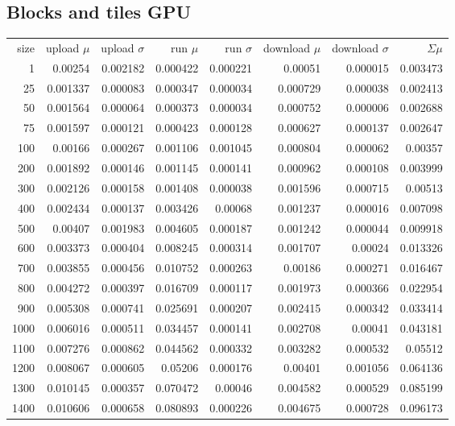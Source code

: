 \subsection*{Blocks and tiles GPU}

\begin{longtable}{r r r r r r r r}
size & upload $\mu$  & upload $\sigma$ & run $\mu$ & run $\sigma$ & download $\mu$ & download $\sigma$ & $\Sigma \mu$ \\
1 & 0.00254 & 0.002182 & 0.000422 & 0.000221 & 0.00051 & 0.000015 & 0.003473 \\
25 & 0.001337 & 0.000083 & 0.000347 & 0.000034 & 0.000729 & 0.000038 & 0.002413 \\
50 & 0.001564 & 0.000064 & 0.000373 & 0.000034 & 0.000752 & 0.000006 & 0.002688 \\
75 & 0.001597 & 0.000121 & 0.000423 & 0.000128 & 0.000627 & 0.000137 & 0.002647 \\
100 & 0.00166 & 0.000267 & 0.001106 & 0.001045 & 0.000804 & 0.000062 & 0.00357 \\
200 & 0.001892 & 0.000146 & 0.001145 & 0.000141 & 0.000962 & 0.000108 & 0.003999 \\
300 & 0.002126 & 0.000158 & 0.001408 & 0.000038 & 0.001596 & 0.000715 & 0.00513 \\
400 & 0.002434 & 0.000137 & 0.003426 & 0.00068 & 0.001237 & 0.000016 & 0.007098 \\
500 & 0.00407 & 0.001983 & 0.004605 & 0.000187 & 0.001242 & 0.000044 & 0.009918 \\
600 & 0.003373 & 0.000404 & 0.008245 & 0.000314 & 0.001707 & 0.00024 & 0.013326 \\
700 & 0.003855 & 0.000456 & 0.010752 & 0.000263 & 0.00186 & 0.000271 & 0.016467 \\
800 & 0.004272 & 0.000397 & 0.016709 & 0.000117 & 0.001973 & 0.000366 & 0.022954 \\
900 & 0.005308 & 0.000741 & 0.025691 & 0.000207 & 0.002415 & 0.000342 & 0.033414 \\
1000 & 0.006016 & 0.000511 & 0.034457 & 0.000141 & 0.002708 & 0.00041 & 0.043181 \\
1100 & 0.007276 & 0.000862 & 0.044562 & 0.000332 & 0.003282 & 0.000532 & 0.05512 \\
1200 & 0.008067 & 0.000605 & 0.05206 & 0.000176 & 0.00401 & 0.001056 & 0.064136 \\
1300 & 0.010145 & 0.000357 & 0.070472 & 0.00046 & 0.004582 & 0.000529 & 0.085199 \\
1400 & 0.010606 & 0.000658 & 0.080893 & 0.000226 & 0.004675 & 0.000728 & 0.096173 \\

\end{longtable}
